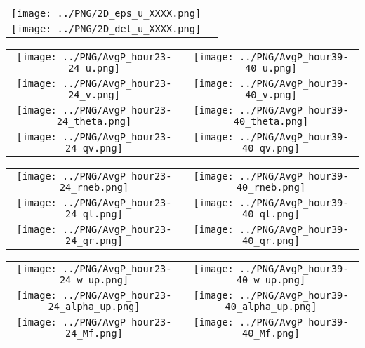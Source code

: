 \documentclass{article}
\begin{document}

\begin{table}
  \begin{tabular}{cc}
     \texttt{[image: ../PNG/2D\_eps\_u\_XXXX.png]} & \\%
     \texttt{[image: ../PNG/2D\_det\_u\_XXXX.png]} & %
  \end{tabular}
\end{table}

\newpage

\begin{table}
  \begin{tabular}{cc}
     \texttt{[image: ../PNG/AvgP\_hour23-24\_u.png]}     & \texttt{[image: ../PNG/AvgP\_hour39-40\_u.png]}     \\
     \texttt{[image: ../PNG/AvgP\_hour23-24\_v.png]}     & \texttt{[image: ../PNG/AvgP\_hour39-40\_v.png]}     \\
     \texttt{[image: ../PNG/AvgP\_hour23-24\_theta.png]} & \texttt{[image: ../PNG/AvgP\_hour39-40\_theta.png]} \\
     \texttt{[image: ../PNG/AvgP\_hour23-24\_qv.png]}    & \texttt{[image: ../PNG/AvgP\_hour39-40\_qv.png]}
  \end{tabular}
\end{table}

\newpage

\begin{table}
  \begin{tabular}{cc}
     \texttt{[image: ../PNG/AvgP\_hour23-24\_rneb.png]} & \texttt{[image: ../PNG/AvgP\_hour39-40\_rneb.png]} \\
     \texttt{[image: ../PNG/AvgP\_hour23-24\_ql.png]}   & \texttt{[image: ../PNG/AvgP\_hour39-40\_ql.png]}  \\
     \texttt{[image: ../PNG/AvgP\_hour23-24\_qr.png]}   & \texttt{[image: ../PNG/AvgP\_hour39-40\_qr.png]}
  \end{tabular}
\end{table}

\newpage

\begin{table}
  \begin{tabular}{cc}
     \texttt{[image: ../PNG/AvgP\_hour23-24\_w\_up.png]}     & \texttt{[image: ../PNG/AvgP\_hour39-40\_w\_up.png]}     \\
     \texttt{[image: ../PNG/AvgP\_hour23-24\_alpha\_up.png]} & \texttt{[image: ../PNG/AvgP\_hour39-40\_alpha\_up.png]} \\
     \texttt{[image: ../PNG/AvgP\_hour23-24\_Mf.png]}       & \texttt{[image: ../PNG/AvgP\_hour39-40\_Mf.png]}
  \end{tabular}
\end{table}
\end{document}
